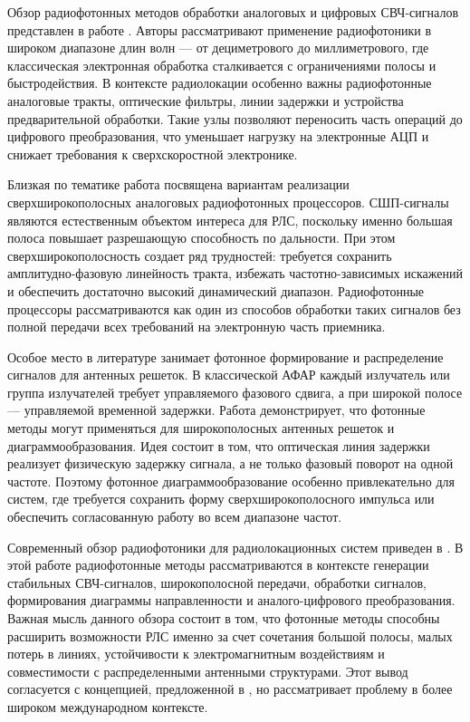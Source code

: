 Обзор радиофотонных методов обработки аналоговых и цифровых СВЧ-сигналов
представлен в работе \cite{belousov2014radiophotonic}. Авторы рассматривают
применение радиофотоники в широком диапазоне длин волн --- от дециметрового до
миллиметрового, где классическая электронная обработка сталкивается с ограничениями
полосы и быстродействия. В контексте радиолокации особенно важны радиофотонные аналоговые
тракты, оптические фильтры, линии задержки и устройства предварительной обработки.
Такие узлы позволяют переносить часть операций до цифрового преобразования, что
уменьшает нагрузку на электронные АЦП и снижает требования к сверхскоростной
электронике.

Близкая по тематике работа \cite{gamilovskaya2015uwb} посвящена вариантам
реализации сверхширокополосных аналоговых радиофотонных процессоров. СШП-сигналы
являются естественным объектом интереса для РЛС, поскольку именно большая полоса
повышает разрешающую способность по дальности. При этом сверхширокополосность
создает ряд трудностей: требуется сохранить амплитудно-фазовую линейность тракта,
избежать частотно-зависимых искажений и обеспечить достаточно высокий динамический
диапазон. Радиофотонные процессоры рассматриваются как один из способов обработки
таких сигналов без полной передачи всех требований на электронную часть приемника.

Особое место в литературе занимает фотонное формирование и распределение сигналов
для антенных решеток. В классической АФАР каждый излучатель или группа излучателей
требует управляемого фазового сдвига, а при широкой полосе --- управляемой временной
задержки. Работа \cite{lee1995photonicwideband} демонстрирует, что фотонные методы
могут применяться для широкополосных антенных решеток и диаграммообразования.
Идея состоит в том, что оптическая линия задержки реализует физическую задержку
сигнала, а не только фазовый поворот на одной частоте. Поэтому фотонное
диаграммообразование особенно привлекательно для систем, где требуется сохранить
форму сверхширокополосного импульса или обеспечить согласованную работу во всем
диапазоне частот.

Современный обзор радиофотоники для радиолокационных систем приведен в
\cite{pan2014microwave}. В этой работе радиофотонные методы рассматриваются в
контексте генерации стабильных СВЧ-сигналов, широкополосной передачи, обработки
сигналов, формирования диаграммы направленности и аналого-цифрового преобразования.
Важная мысль данного обзора состоит в том, что фотонные методы способны расширить
возможности РЛС именно за счет сочетания большой полосы, малых потерь в линиях,
устойчивости к электромагнитным воздействиям и совместимости с распределенными
антенными структурами. Этот вывод согласуется с концепцией, предложенной в
\cite{shumov2016concept}, но рассматривает проблему в более широком международном
контексте.

